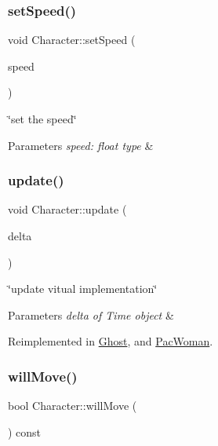 \subsubsection{\texorpdfstring{set\+Speed()}{setSpeed()}}
{\footnotesize\ttfamily void Character\+::set\+Speed (\begin{DoxyParamCaption}\item[{float}]{speed }\end{DoxyParamCaption})}



\char`\"{}set the speed\char`\"{} 


\begin{DoxyParams}{Parameters}
{\em speed\+: float type} & \\
\hline
\end{DoxyParams}
\mbox{\label{classCharacter_a9d20989cb4d1c826f98f9d6f7c9f63a6}} 
\subsubsection{\texorpdfstring{update()}{update()}}
{\footnotesize\ttfamily void Character\+::update (\begin{DoxyParamCaption}\item[{sf\+::\+Time}]{delta }\end{DoxyParamCaption})\hspace{0.3cm}{\ttfamily [virtual]}}



\char`\"{}update vitual implementation\char`\"{} 


\begin{DoxyParams}{Parameters}
{\em delta of Time object} & \\
\hline
\end{DoxyParams}


Reimplemented in \hyperlink{classGhost_a0ac45a3d870db2f286645e909e868738}{Ghost}, and \hyperlink{classPacWoman_a82b822a1b09b749568031b76f62ddae7}{Pac\+Woman}.

\mbox{\label{classCharacter_a53d02c2b1c914990e51e0fb84913d151}} 
\subsubsection{\texorpdfstring{will\+Move()}{willMove()}}
{\footnotesize\ttfamily bool Character\+::will\+Move (\begin{DoxyParamCaption}{ }\end{DoxyParamCaption}) const}



